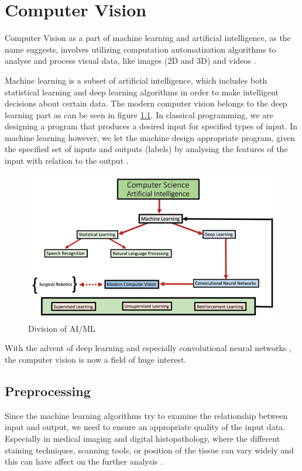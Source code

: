 \chapter{Computer Vision}
Computer Vision as a part of machine learning and artificial intelligence, as the name suggests, involves utilizing computation automatization algorithms to analyse and process visual data, like images (2D and 3D) and videos \cite{Szeliski2022, Atallah2020}.

Machine learning is a subset of artificial intelligence, which includes both statistical learning and deep learning algorithms in order to make intelligent decisions about certain data. The modern computer vision belongs to the deep learning part as can be seen in figure \ref{fig:ai-ml}. In classical programming, we are designing a program that produces a desired input for specified types of input. In machine learning however, we let the machine design appropriate program, given the specified set of inputs and outputs (labels) by analysing the features of the input with relation to the output \cite{Alam2021}.

\begin{figure}[H]
\begin{centering}
\includegraphics[width=12cm]{assets/images/aiml.png}
\par\end{centering}
\caption{Division of AI/ML \cite{Atallah2020}}
\label{fig:ai-ml}
\end{figure}

With the advent of deep learning \cite{LeCun2015} and especially convolutional neural networks \cite{Ronneberger2015}, the computer vision is now a field of huge interest.

\section{Preprocessing}
Since the machine learning algorithms try to examine the relationship between input and output, we need to ensure an appropriate quality of the input data. Especially in medical imaging and digital histopathology, where the different staining techniques, scanning tools, or position of the tissue can vary widely and this can have affect on the further analysis \cite{Hoque2024}.

